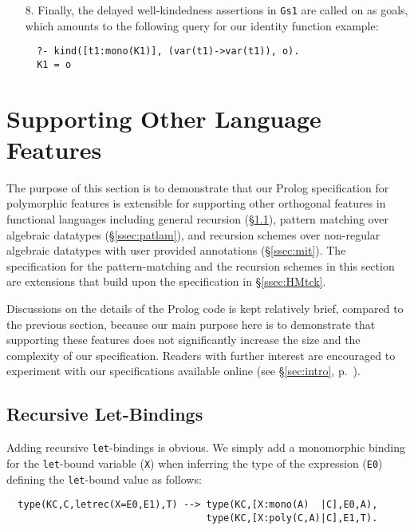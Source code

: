 \documentclass[runningheads,a4paper]{llncs}
\begin{document}
\begin{itemize}
{\small\verb|Gs1 = [kind([t1:mono(K1)], (var(t1)->var(t1)), o)]|}.
\item[8.] Finally, the delayed well-kindedness assertions in {\small\verb|Gs1|}
  are called on as goals, which amounts to the following query
  for our identity function example:{\small \vspace*{-1ex}
\begin{verbatim}
  ?- kind([t1:mono(K1)], (var(t1)->var(t1)), o).
  K1 = o
\end{verbatim} \vspace*{-.7ex} }%
\vspace*{-1.5ex}
\end{itemize}

\section{Supporting Other Language Features}\label{sec:other}
The purpose of this section is to demonstrate that our Prolog specification
for polymorphic features is extensible for supporting other orthogonal
features in functional languages including general recursion
(\S\ref{ssec:letrec}), pattern matching over algebraic datatypes
(\S\ref{ssec:patlam}), and recursion schemes over non-regular
algebraic datatypes with user provided annotations (\S\ref{ssec:mit}).
The specification for the pattern-matching and the recursion schemes
in this section are extensions that build upon the specification
in \S\ref{ssec:HMtck}.

Discussions on the details of the Prolog code is kept relatively brief,
compared to the previous section, because our main purpose here is to
demonstrate that supporting these features does not significantly increase
the size and the complexity of our specification. Readers with further
interest are encouraged to experiment with our specifications available
online (see \S\ref{sec:intro}, p.~\pageref{githubURL}).

\subsection{Recursive Let-Bindings}\label{ssec:letrec}
Adding recursive \texttt{let}-bindings is obvious. We simply add
a monomorphic binding for the \texttt{let}-bound variable (\verb|X|)
when inferring the type of the expression (\verb|E0|) defining
the \texttt{let}-bound value as follows:
{\small \vspace*{-1ex}
\begin{verbatim}
  type(KC,C,letrec(X=E0,E1),T) --> type(KC,[X:mono(A)  |C],E0,A),
                                   type(KC,[X:poly(C,A)|C],E1,T).
\end{verbatim} \vspace*{-.7ex} }
\end{document}
